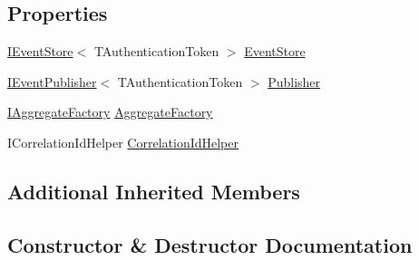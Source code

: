 \subsection*{Properties}
\begin{DoxyCompactItemize}
\item 
\hyperlink{interfaceCqrs_1_1Events_1_1IEventStore}{I\+Event\+Store}$<$ T\+Authentication\+Token $>$ \hyperlink{classCqrs_1_1Domain_1_1Repository_a9adbd73546e04ef67c8fb032e9c6d1a8_a9adbd73546e04ef67c8fb032e9c6d1a8}{Event\+Store}
\item 
\hyperlink{interfaceCqrs_1_1Events_1_1IEventPublisher}{I\+Event\+Publisher}$<$ T\+Authentication\+Token $>$ \hyperlink{classCqrs_1_1Domain_1_1Repository_a11b1d3a66404b212e93ca706e7c5eea4_a11b1d3a66404b212e93ca706e7c5eea4}{Publisher}
\item 
\hyperlink{interfaceCqrs_1_1Domain_1_1Factories_1_1IAggregateFactory}{I\+Aggregate\+Factory} \hyperlink{classCqrs_1_1Domain_1_1Repository_a02cee15b1d3f603c1ae437b366e83085_a02cee15b1d3f603c1ae437b366e83085}{Aggregate\+Factory}
\item 
I\+Correlation\+Id\+Helper \hyperlink{classCqrs_1_1Domain_1_1Repository_a3504ed9a3ff1c689ba89c574619893af_a3504ed9a3ff1c689ba89c574619893af}{Correlation\+Id\+Helper}
\end{DoxyCompactItemize}
\subsection*{Additional Inherited Members}


\subsection{Constructor \& Destructor Documentation}
\mbox{\label{classCqrs_1_1Domain_1_1Repository_ab513757cb27ab3f34a1cd4d5396aa0c1_ab513757cb27ab3f34a1cd4d5396aa0c1}} 
